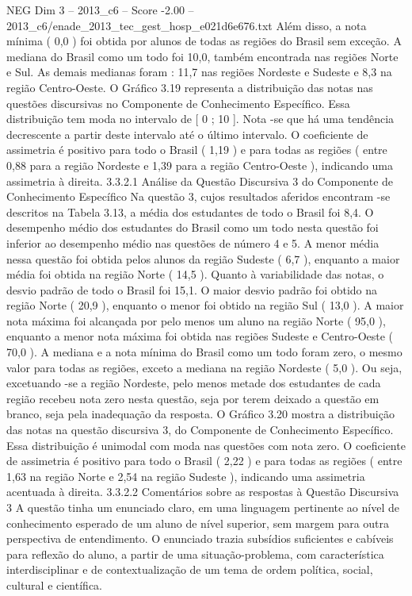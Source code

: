 \begin{textsample}{NEG Dim 3 – 2013\_c6 – Score -2.00 – 2013\_c6/enade\_2013\_tec\_gest\_hosp\_e021d6e676.txt}
Além disso, a nota mínima ( 0,0 ) foi obtida por alunos de todas as regiões do Brasil sem exceção.
A mediana do Brasil como um todo foi 10,0, também encontrada nas regiões Norte e Sul.
As demais medianas foram : 11,7 nas regiões Nordeste e Sudeste e 8,3 na região Centro-Oeste.
O Gráfico 3.19 representa a distribuição das notas nas questões discursivas no Componente de Conhecimento Específico.
Essa distribuição tem moda no intervalo de [ 0 ; 10 ].
Nota -se que há uma tendência decrescente a partir deste intervalo até o último intervalo.
O coeficiente de assimetria é positivo para todo o Brasil ( 1,19 ) e para todas as regiões ( entre 0,88 para a região Nordeste e 1,39 para a região Centro-Oeste ), indicando uma assimetria à direita. 3.3.2.1 Análise da Questão Discursiva 3 do Componente de Conhecimento Específico Na questão 3, cujos resultados aferidos encontram -se descritos na Tabela 3.13, a média dos estudantes de todo o Brasil foi 8,4.
O desempenho médio dos estudantes do Brasil como um todo nesta questão foi inferior ao desempenho médio nas questões de número 4 e 5.
A menor média nessa questão foi obtida pelos alunos da região Sudeste ( 6,7 ), enquanto a maior média foi obtida na região Norte ( 14,5 ).
Quanto à variabilidade das notas, o desvio padrão de todo o Brasil foi 15,1.
O maior desvio padrão foi obtido na região Norte ( 20,9 ), enquanto o menor foi obtido na região Sul ( 13,0 ).
A maior nota máxima foi alcançada por pelo menos um aluno na região Norte ( 95,0 ), enquanto a menor nota máxima foi obtida nas regiões Sudeste e Centro-Oeste ( 70,0 ).
A mediana e a nota mínima do Brasil como um todo foram zero, o mesmo valor para todas as regiões, exceto a mediana na região Nordeste ( 5,0 ).
Ou seja, excetuando -se a região Nordeste, pelo menos metade dos estudantes de cada região recebeu nota zero nesta questão, seja por terem deixado a questão em branco, seja pela inadequação da resposta.
O Gráfico 3.20 mostra a distribuição das notas na questão discursiva 3, do Componente de Conhecimento Específico.
Essa distribuição é unimodal com moda nas questões com nota zero.
O coeficiente de assimetria é positivo para todo o Brasil ( 2,22 ) e para todas as regiões ( entre 1,63 na região Norte e 2,54 na região Sudeste ), indicando uma assimetria acentuada à direita. 3.3.2.2 Comentários sobre as respostas à Questão Discursiva 3 A questão tinha um enunciado claro, em uma linguagem pertinente ao nível de conhecimento esperado de um aluno de nível superior, sem margem para outra perspectiva de entendimento.
O enunciado trazia subsídios suficientes e cabíveis para reflexão do aluno, a partir de uma situação-problema, com característica interdisciplinar e de contextualização de um tema de ordem política, social, cultural e científica.

\end{textsample}
